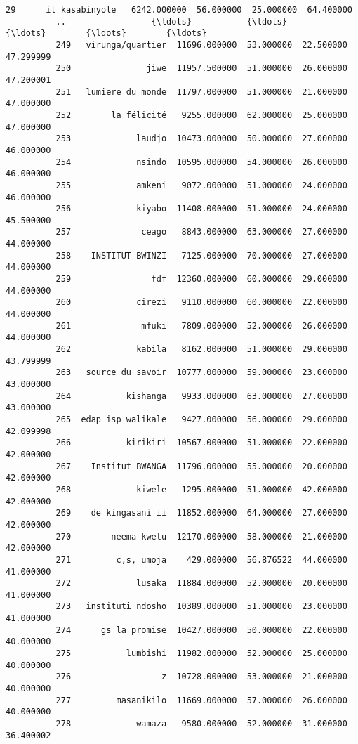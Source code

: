 \documentclass[11pt]{article}
\begin{document}
\begin{Verbatim}[commandchars=\\\{\}]
          29      it kasabinyole   6242.000000  56.000000  25.000000  64.400000   
          ..                 {\ldots}           {\ldots}        {\ldots}        {\ldots}        {\ldots}   
          249   virunga/quartier  11696.000000  53.000000  22.500000  47.299999   
          250               jiwe  11957.500000  51.000000  26.000000  47.200001   
          251   lumiere du monde  11797.000000  51.000000  21.000000  47.000000   
          252        la félicité   9255.000000  62.000000  25.000000  47.000000   
          253             laudjo  10473.000000  50.000000  27.000000  46.000000   
          254             nsindo  10595.000000  54.000000  26.000000  46.000000   
          255             amkeni   9072.000000  51.000000  24.000000  46.000000   
          256             kiyabo  11408.000000  51.000000  24.000000  45.500000   
          257              ceago   8843.000000  63.000000  27.000000  44.000000   
          258    INSTITUT BWINZI   7125.000000  70.000000  27.000000  44.000000   
          259                fdf  12360.000000  60.000000  29.000000  44.000000   
          260             cirezi   9110.000000  60.000000  22.000000  44.000000   
          261              mfuki   7809.000000  52.000000  26.000000  44.000000   
          262             kabila   8162.000000  51.000000  29.000000  43.799999   
          263   source du savoir  10777.000000  59.000000  23.000000  43.000000   
          264           kishanga   9933.000000  63.000000  27.000000  43.000000   
          265  edap isp walikale   9427.000000  56.000000  29.000000  42.099998   
          266           kirikiri  10567.000000  51.000000  22.000000  42.000000   
          267    Institut BWANGA  11796.000000  55.000000  20.000000  42.000000   
          268             kiwele   1295.000000  51.000000  42.000000  42.000000   
          269    de kingasani ii  11852.000000  64.000000  27.000000  42.000000   
          270        neema kwetu  12170.000000  58.000000  21.000000  42.000000   
          271         c,s, umoja    429.000000  56.876522  44.000000  41.000000   
          272             lusaka  11884.000000  52.000000  20.000000  41.000000   
          273   instituti ndosho  10389.000000  51.000000  23.000000  41.000000   
          274      gs la promise  10427.000000  50.000000  22.000000  40.000000   
          275           lumbishi  11982.000000  52.000000  25.000000  40.000000   
          276                  z  10728.000000  53.000000  21.000000  40.000000   
          277         masanikilo  11669.000000  57.000000  26.000000  40.000000   
          278             wamaza   9580.000000  52.000000  31.000000  36.400002   
          

\end{Verbatim}
\end{document}

